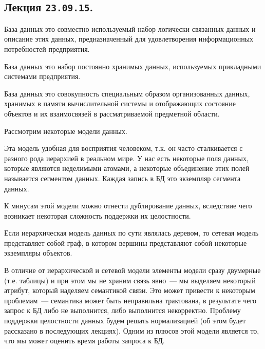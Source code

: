 \subsection{%
  Лекция \texttt{23.09.15}.%
}

\begin{definition}
  База данных это совместно используемый набор логически связанных данных и
  описание этих данных, предназначенный для удовлетворения информационных
  потребностей предприятия.
\end{definition}

\begin{definition}[по Дейту]
  База данных это набор постоянно хранимых данных, используемых прикладными
  системами предприятия.
\end{definition}

\begin{definition}[по Хомоненко]
  База данных это совокупность специальным образом организованных данных,
  хранимых в памяти вычислительной системы и отображающих состояние объектов и
  их взаимосвязей в рассматриваемой предметной области.
\end{definition}

Рассмотрим некоторые модели данных.


Эта модель удобная для восприятия человеком, т.к. он часто сталкивается с
разного рода иерархией в реальном мире. У нас есть некоторые поля данных,
которые являются неделимыми атомами, а некоторые объединение этих полей
называется сегментом данных. Каждая запись в БД это экземпляр сегмента данных.

К минусам этой модели можно отнести дублирование данных, вследствие чего
возникает некоторая сложность поддержки их целостности.


Если иерархическая модель данных по сути являлась деревом, то сетевая модель
представляет собой граф, в котором вершины представляют собой некоторые
экземпляры объектов.


В отличие от иерархической и сетевой модели элементы модели сразу двумерные
(т.е. таблицы) и при этом мы не храним связь явно~--- мы выделяем некоторый
атрибут, который наделяем семантикой связи. Это может привести к некоторым
проблемам~--- семантика может быть неправильна трактована, в результате чего
запрос к БД либо не выполнится, либо выполнится некорректно. Проблему поддержки
целостности данных будем решать нормализацией (об этом будет рассказано в
последующих лекциях). Одним из плюсов этой модели является то, что мы может
оценить время работы запроса к БД.

